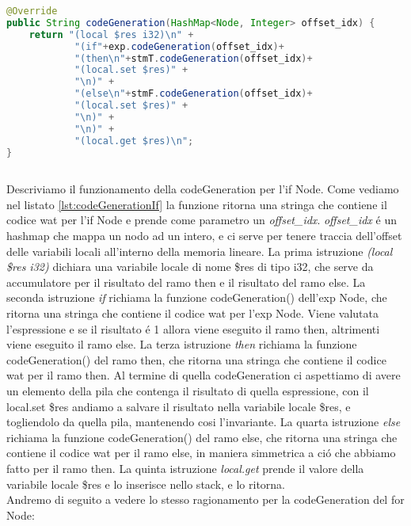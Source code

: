 \documentclass[../../main.tex]{subfiles}
\begin{document}
\begin{lstlisting}[language=Java, caption={codeGeneration() per l'if Node}, label={lst:codeGenerationIf}]
@Override
public String codeGeneration(HashMap<Node, Integer> offset_idx) {
    return "(local $res i32)\n" +
            "(if"+exp.codeGeneration(offset_idx)+
            "(then\n"+stmT.codeGeneration(offset_idx)+
            "(local.set $res)" +
            "\n)" +
            "(else\n"+stmF.codeGeneration(offset_idx)+
            "(local.set $res)" +
            "\n)" +
            "\n)" +
            "(local.get $res)\n";
}
    
\end{lstlisting}
Descriviamo il funzionamento della codeGeneration per l'if Node. Come vediamo nel listato \ref{lst:codeGenerationIf} la funzione ritorna una stringa che contiene il codice wat per l'if Node e prende come parametro un \textit{offset\_idx}.
\textit{offset\_idx} é un hashmap che mappa un nodo ad un intero, e ci serve per tenere traccia dell'offset delle variabili locali all'interno della memoria lineare.
La prima istruzione \textit{(local \$res i32)} dichiara una variabile locale di nome \$res di tipo i32, che serve da accumulatore per il risultato del ramo then e il risultato del ramo else.
La seconda istruzione \textit{if} richiama la funzione codeGeneration() dell'exp Node, che ritorna una stringa che contiene il codice wat per l'exp Node.
Viene valutata l'espressione e se il risultato é 1 allora viene eseguito il ramo then, altrimenti viene eseguito il ramo else.
La terza istruzione \textit{then} richiama la funzione codeGeneration() del ramo then, che ritorna una stringa che contiene il codice wat per il ramo then.
Al termine di quella codeGeneration ci aspettiamo di avere un elemento della pila che contenga il risultato di quella espressione, con il local.set \$res andiamo a salvare il risultato nella variabile locale \$res, e togliendolo da quella pila, mantenendo cosi l'invariante.
La quarta istruzione \textit{else} richiama la funzione codeGeneration() del ramo else, che ritorna una stringa che contiene il codice wat per il ramo else, in maniera simmetrica a ció che abbiamo fatto per il ramo then.
La quinta istruzione \textit{local.get} prende il valore della variabile locale \$res e lo inserisce nello stack, e lo ritorna.\\
Andremo di seguito a vedere lo stesso ragionamento per la codeGeneration del for Node:
    
\end{document}
